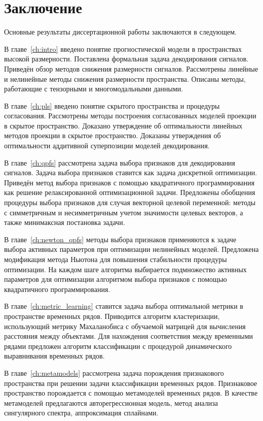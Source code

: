 \chapter*{Заключение}

Основные результаты диссертационной работы заключаются в следующем.

В главе~\ref{ch:intro} введено понятие прогностической модели в пространствах высокой размерности.
Поставлена формальная задача декодирования сигналов.
Приведён обзор методов снижения размерности сигналов.
Рассмотрены линейные и нелинейные методы снижения размерности пространства.
Описаны методы, работающие с тензорными и многомодальными данными.

В главе~\ref{ch:pls} введено понятие скрытого пространства и процедуры согласования.
Рассмотрены методы построения согласованных моделей проекции в скрытое пространство.
Доказано утверждение об оптимальности линейных методов проекции в скрытое пространство.
Доказаны утверждения об оптимальности аддитивной суперпозиции моделей декодирования.

В главе~\ref{ch:qpfs} рассмотрена задача выбора признаков для декодирования сигналов.
Задача выбора признаков ставится как задача дискретной оптимизации. 
Приведён метод выбора признаков с помощью квадратичного программирования как решение релаксированной оптимизационной задачи.
Предложены обобщения процедуры выбора признаков для случая векторной целевой переменной: методы с симметричным и несимметричным учетом значимости целевых векторов, а также минимаксная постановка задачи.

В главе~\ref{ch:newton_qpfs} методы выбора признаков применяются к задаче выбора активных параметров при оптимизации нелинейных моделей.
Предложена модификация метода Ньютона для повышения стабильности процедуры оптимизации.
На каждом шаге алгоритма выбирается подмножество активных параметров для оптимизации алгоритмом выбора признаков с помощью квадратичного программирования.

В главе~\ref{ch:metric_learning} ставится задача выбора оптимальной метрики в пространстве временных рядов.
Приводится алгоритм кластеризации, использующий метрику Махаланобиса с обучаемой матрицей для вычисления расстояния между объектами. 
Для нахождения соответствия между временными рядами предложен алгоритм классификации с процедурой динамического выравнивания временных рядов.

В главе~\ref{ch:metamodels} рассмотрена задача порождения признакового пространства при решении задачи классификации временных рядов.
Признаковое пространство порождается с помощью метамоделей временных рядов.
В качестве метамоделей предлагаются авторегрессионная модель, метод анализа сингулярного спектра, аппроксимация сплайнами.